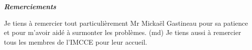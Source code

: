 
\vspace*{\fill}

\begin{flushright}

{\LARGE\par{\textbf{\emph{Remerciements}}}}

Je tiens à remercier tout particulièrement Mr Mickaël Gastineau pour sa patience et pour m'avoir aidé à surmonter les 
problèmes. (md) Je tiens aussi à remercier tous les membres de l'IMCCE pour leur accueil.

\end{flushright}

\vspace{\fill}
